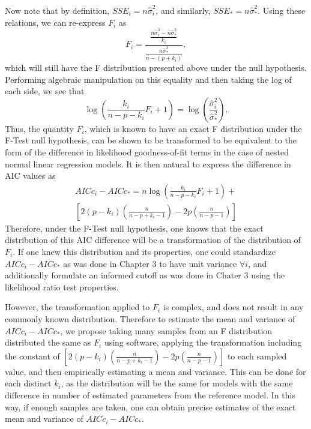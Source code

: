 Now note that by definition, $SSE_i = n \hat{\sigma}^2_i$, and similarly, $SSE_* = n \hat{\sigma}^2_*$. Using these relations, we can re-express
$F_i$ as
\begin{equation}
	F_i = \frac{\frac{n \hat{\sigma}^2_i - n \hat{\sigma}^2_*}{k_i}}{\frac{n \hat{\sigma}^2_*}{n-(p+k_i)}} ,
\end{equation}
which will still have the F distribution presented above under the null hypothesis. Performing algebraic manipulation on this equality and
then taking the log of each side, we see that
\begin{equation}
	\log \left( \frac{k_i}{n-p-k_i} F_i + 1 \right) = \log \left( \frac{\hat{\sigma}^2_i}{\hat{\sigma}^2_*} \right) .
\end{equation}
Thus, the quantity $F_i$, which is known to have an exact F distribution under the F-Test null hypothesis, can be shown to be transformed to
be equivalent to the form of the difference in likelihood goodness-of-fit terms in the case of nested normal linear regression models.
It is then natural to express the difference in AIC values as
\begin{equation}
	\begin{split}
	AICc_i - AICc_* = n \log \left( \frac{k_i}{n-p-k_i} F_i + 1 \right) + \\
	\left[ 2(p-k_i) \left( \frac{n}{n-p+k_i-1} \right) - 2p \left( \frac{n}{n-p-1} \right) \right]
	\end{split}
\end{equation}
Therefore, under the F-Test null hypothesis, one knows that the exact distribution of this AIC difference will be a transformation of the
distribution of $F_i$. If one knew this distribution and its properties, one could standardize $AICc_i - AICc_*$ as was done in Chapter 3
to have unit variance $\forall i$, and additionally formulate an informed cutoff as was done in Chater 3 using the likelihood ratio
test properties.

However, the transformation applied to $F_i$ is complex, and does not result in any commonly known distribution. Therefore to estimate
the mean and variance of $AICc_i - AICc_*$, we propose taking many samples from an F distribution distributed the same as $F_i$
using software, applying the transformation including the constant of $\left[ 2(p-k_i) \left( \frac{n}{n-p+k_i-1} \right) - 2p \left( \frac{n}{n-p-1} \right) \right]$ to each sampled value,
and then empirically estimating a mean and variance. This can be done for each distinct $k_i$, as the distribution will be the same for models with
the same difference in number of estimated parameters from the reference model. In this way, if enough samples are taken, one can obtain precise estimates
of the exact mean and variance of $AICc_i - AICc_*$.

